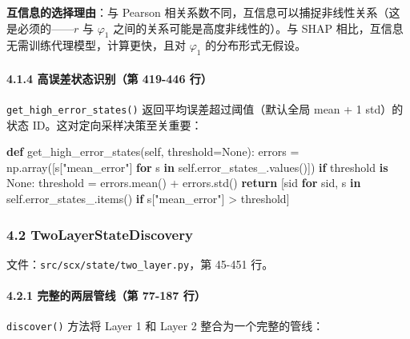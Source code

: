 \documentclass[
  12pt,
]{ctexart}
\newenvironment{Shaded}{}{}
\newcommand{\ControlFlowTok}[1]{\textcolor[rgb]{0.00,0.44,0.13}{\textbf{#1}}}
\newcommand{\KeywordTok}[1]{\textcolor[rgb]{0.00,0.44,0.13}{\textbf{#1}}}
\newcommand{\NormalTok}[1]{#1}
\newcommand{\OperatorTok}[1]{\textcolor[rgb]{0.40,0.40,0.40}{#1}}
\newcommand{\StringTok}[1]{\textcolor[rgb]{0.25,0.44,0.63}{#1}}
\newcommand{\VariableTok}[1]{\textcolor[rgb]{0.10,0.09,0.49}{#1}}
\begin{document}
\textbf{互信息的选择理由}：与 Pearson
相关系数不同，互信息可以捕捉非线性关系（这是必须的------\(r\) 与
\(\varphi_1\) 之间的关系可能是高度非线性的）。与 SHAP
相比，互信息无需训练代理模型，计算更快，且对 \(\varphi_1\)
的分布形式无假设。

\paragraph{4.1.4 高误差状态识别（第 419-446
行）}\label{ux9ad8ux8befux5deeux72b6ux6001ux8bc6ux522bux7b2c-419-446-ux884c}

\texttt{get\_high\_error\_states()} 返回平均误差超过阈值（默认全局 mean
+ 1 std）的状态 ID。这对定向采样决策至关重要：

\begin{Shaded}
\begin{Highlighting}[]
\KeywordTok{def}\NormalTok{ get\_high\_error\_states(}\VariableTok{self}\NormalTok{, threshold}\OperatorTok{=}\VariableTok{None}\NormalTok{):}
\NormalTok{    errors }\OperatorTok{=}\NormalTok{ np.array([s[}\StringTok{"mean\_error"}\NormalTok{] }\ControlFlowTok{for}\NormalTok{ s }\KeywordTok{in} \VariableTok{self}\NormalTok{.error\_states\_.values()])}
    \ControlFlowTok{if}\NormalTok{ threshold }\KeywordTok{is} \VariableTok{None}\NormalTok{:}
\NormalTok{        threshold }\OperatorTok{=}\NormalTok{ errors.mean() }\OperatorTok{+}\NormalTok{ errors.std()}
    \ControlFlowTok{return}\NormalTok{ [sid }\ControlFlowTok{for}\NormalTok{ sid, s }\KeywordTok{in} \VariableTok{self}\NormalTok{.error\_states\_.items()}
            \ControlFlowTok{if}\NormalTok{ s[}\StringTok{"mean\_error"}\NormalTok{] }\OperatorTok{\textgreater{}}\NormalTok{ threshold]}
\end{Highlighting}
\end{Shaded}

\subsubsection{4.2 TwoLayerStateDiscovery}\label{twolayerstatediscovery}

文件：\texttt{src/scx/state/two\_layer.py}，第 45-451 行。

\paragraph{4.2.1 完整的两层管线（第 77-187
行）}\label{ux5b8cux6574ux7684ux4e24ux5c42ux7ba1ux7ebfux7b2c-77-187-ux884c}

\texttt{discover()} 方法将 Layer 1 和 Layer 2 整合为一个完整的管线：
\end{document}
